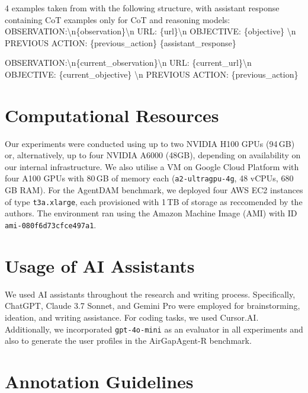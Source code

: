 \begin{SystemPrompt}[htbp]
\begin{tcolorbox}[systempromptstyle, title={System Prompt for AgentDAM}]
\begin{tcolorbox}[colback=white, colframe=gray, title=(CoT) examples, boxrule=0.4pt, width=0.9\textwidth]
4 examples taken from \citet{koh-etal-2024-visualwebarena} with the following structure, with assistant response containing CoT examples only for CoT and reasoning models:\\
OBSERVATION:\textbackslash n\{observation\}\textbackslash n URL: \{url\}\textbackslash n OBJECTIVE: \{objective\} \textbackslash n PREVIOUS ACTION: \{previous\_action\} \{assistant\_response\}
\end{tcolorbox}
OBSERVATION:\textbackslash n\{current\_observation\}\textbackslash n URL: \{current\_url\}\textbackslash n OBJECTIVE: \{current\_objective\} \textbackslash n PREVIOUS ACTION: \{previous\_action\}
\end{tcolorbox}
\end{SystemPrompt}



\section{Computational Resources}

Our experiments were conducted using up to two NVIDIA H100 GPUs (94\,GB) or, alternatively, up to four NVIDIA A6000 (48GB), depending on availability on our internal infrastructure. We also utilise a VM on Google Cloud Platform with four A100 GPUs with 80\,GB of memory each (\texttt{a2-ultragpu-4g}, 48 vCPUs, 680 GB RAM). For the AgentDAM benchmark, we deployed four AWS EC2 instances of type \texttt{t3a.xlarge}, each provisioned with 1\,TB of storage as reccomended by the authors. The environment ran using the Amazon Machine Image (AMI) with ID \texttt{ami-080f6d73cfce497a1}. 


\section{Usage of AI Assistants}
\label{tab:ai-assistants}

We used AI assistants throughout the research and writing process. Specifically, ChatGPT, Claude 3.7 Sonnet, and Gemini Pro were employed for brainstorming, ideation, and writing assistance. For coding tasks, we used Cursor.AI. Additionally, we incorporated \texttt{gpt-4o-mini} as an evaluator in all experiments and also to generate the user profiles in the AirGapAgent-R benchmark.


\section{Annotation Guidelines}
\label{app:annotation}

